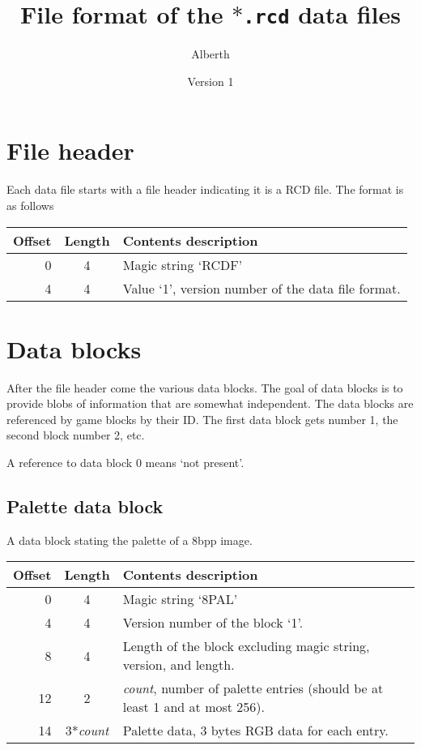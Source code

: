 \documentclass{article}
\title{File format of the \texttt{$*$.rcd} data files}
\author{Alberth}
\date{Version 1}
\begin{document}
\maketitle

\section{File header}
Each data file starts with a file header indicating it is a RCD{} file.
The format is as follows

\begin{center}
\begin{tabular}{|r|c|l|} \hline
\textbf{Offset} & \textbf{Length} & \textbf{Contents description} \\ \hline
0 & 4 & Magic string `RCDF' \\
4 & 4 & Value `1', version number of the data file format. \\ \hline
\end{tabular}
\end{center}

\section{Data blocks}
After the file header come the various data blocks.
The goal of data blocks is to provide blobs of information that are somewhat independent.
The data blocks are referenced by game blocks by their ID. The first data block
gets number 1, the second block number 2, etc.

A reference to data block 0 means `not present'.

\subsection{Palette data block}
A data block stating the palette of a 8bpp image.

\begin{center}
\begin{tabular}{|r|c|l|} \hline
\textbf{Offset} & \textbf{Length} & \textbf{Contents description} \\ \hline
0 & 4 & Magic string `8PAL' \\
4 & 4 & Version number of the block `1'. \\
8 & 4 & Length of the block excluding magic string, version, and length. \\
12 & 2 & \textit{count}, number of palette entries (should be at least 1 and at most 256). \\
14 & 3*\textit{count} & Palette data, 3 bytes RGB{} data for each entry. \\ \hline
\end{tabular}
\end{center}
\end{document}
